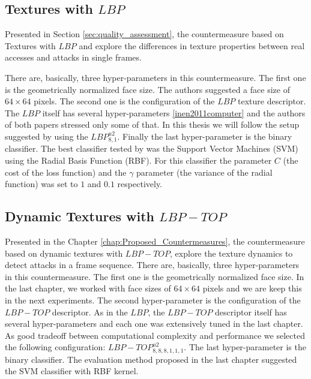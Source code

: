 \subsection{Textures with $LBP$}

Presented in Section \ref{sec:quality_assessment}, the countermeasure based on Textures with $LBP$ \cite{ChingovskaBIOSIG2012} and \cite{maatta2011face} explore the differences in texture properties between real accesses and attacks in single frames. 

There are, basically, three hyper-parameters in this countermeasure. The first one is the geometrically normalized face size. The authors suggested a face size of $64 \times 64$ pixels. The second one is the configuration of the $LBP$ texture descriptor. The $LBP$ itself has several hyper-parameters \ref{inen2011computer} and the authors of both papers stressed only some of that. In this thesis we will follow the setup suggested by \cite{ChingovskaBIOSIG2012} using the $LBP_{8,1}^{u2}$. Finally the last hyper-parameter is the binary classifier. The best classifier tested by \cite{ChingovskaBIOSIG2012} was the Support Vector Machines (SVM) using the Radial Basis Function (RBF). For this classifier the parameter $C$ (the cost of the loss function) and the $\gamma$ parameter (the variance of the radial function) was set to $1$ and $0.1$ respectively.

\subsection{Dynamic Textures with $LBP-TOP$}

Presented in the Chapter \ref{chap:Proposed_Countermeasures}, the countermeasure based on dynamic textures with $LBP-TOP$, explore the texture dynamics to detect attacks in a frame sequence. There are, basically, three hyper-parameters in this countermeasure. The first one is the geometrically normalized face size. In the last chapter, we worked with face sizes of $64 \times 64$ pixels and we are keep this in the next experiments. The second hyper-parameter is the configuration of the $LBP-TOP$ descriptor. As in the $LBP$, the $LBP-TOP$ descriptor itself has several hyper-parameters and each one was extensively tuned in the last chapter. As good tradeoff between computational complexity and performance we selected the following configuration: $LBP-TOP^{u2}_{8,8,8,1,1,1}$. The last hyper-parameter is the binary classifier. The evaluation method proposed in the last chapter suggested the SVM classifier with RBF kernel.


